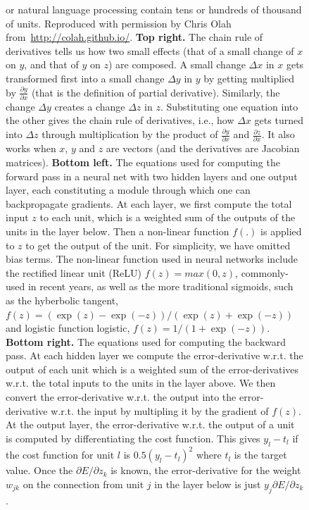 \documentclass[10pts]{article}
\begin{document}
\begin{figure}[b]
{\begin{minipage}{\textwidth}
{or natural language processing contain tens or hundreds of thousand
of units. Reproduced with permission by Chris Olah from~\url{http://colah.github.io/}.
\newline
{\bf Top right.} The chain rule of derivatives tells us how
two small effects (that of a small change of $x$ on $y$, and that of $y$ on $z$)
are composed. A small change $\Delta x$ in $x$
gets transformed first into a small change $\Delta y$ in $y$
by getting multiplied by $\frac{\partial y}{\partial x}$
(that is the definition of partial derivative). Similarly,
the change $\Delta y$ creates a change $\Delta z$ in $z$. Substituting one equation
into the other gives the chain rule of derivatives, i.e., how
$\Delta x$ gets turned into $\Delta z$ through multiplication
by the product of $\frac{\partial y}{\partial x}$ and
$\frac{\partial z}{\partial x}$. It also works when $x$, $y$
and $z$ are vectors (and the derivatives are Jacobian matrices). 
\newline
{\bf Bottom left.} 
The equations used for computing the forward pass in a neural
net with two hidden layers and one output layer, each constituting
a module through which one can backpropagate gradients. At each layer, we first compute the total
input $z$ to each unit, which is a weighted sum of the outputs of the
units in the layer below. Then a non-linear function $f(.)$ is applied
to $z$ to get the output of the unit.  For simplicity, we have omitted
bias terms. The non-linear function used in neural networks include 
the rectified linear unit (ReLU) $f(z) = max(0, z)$, commonly-used in 
recent years, as well as the more traditional sigmoids, such as the 
hyberbolic tangent, $f(z) = (\exp(z)-\exp(-z))/(\exp(z)+\exp(-z))$ 
and logistic function logistic, $f(z) = 1/(1+\exp(-z))$.
{\bf Bottom right.} 
The equations used for computing the backward pass. At each
hidden layer we compute the error-derivative w.r.t. the output of each
unit which is a weighted sum of the error-derivatives w.r.t. the total
inputs to the units in the layer above. We then convert the
error-derivative w.r.t. the output into the error-derivative w.r.t.
the input by multipling it by the gradient of $f(z)$.  At the output
layer, the error-derivative w.r.t. the output of a unit is computed by
differentiating the cost function. This gives $y_l-t_l$ if the cost
function for unit $l$ is $0.5(y_l-t_l)^2$ where $t_l$ is the target
value. Once the $\partial E/\partial z_k$ is known, the
error-derivative for the weight $w_{jk}$ on the connection from unit
$j$ in the layer below is just $y_j \partial E/\partial z_k$.
}
\label{fig:backprop-box}
\end{minipage}
}
\end{figure}
\end{document}
